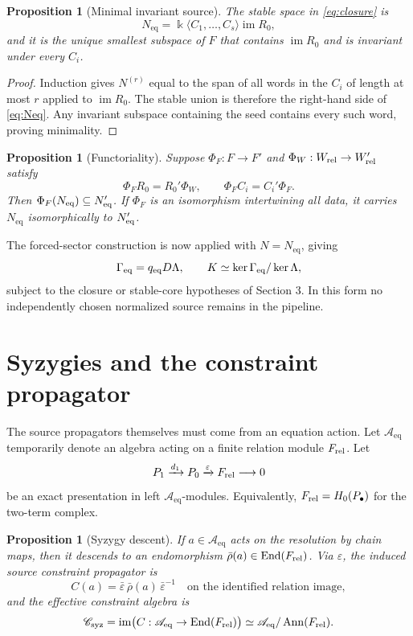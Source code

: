 \documentclass[11pt]{article}
\newtheorem{proposition}[theorem]{Proposition}
\theoremstyle{definition}
\newcommand{\kk}{\Bbbk}
\newcommand{\im}{\operatorname{im}}
\newcommand{\End}{\operatorname{End}}
\newcommand{\Aeq}{\mathscr A_{\mathrm{eq}}}
\newcommand{\Neq}{N_{\mathrm{eq}}}
\newcommand{\Geq}{\Gamma_{\mathrm{eq}}}
\newcommand{\Csyz}{\mathscr C_{\mathrm{syz}}}
\begin{document}
\begin{proposition}[Minimal invariant source]
The stable space in \eqref{eq:closure} is
\begin{equation}
\Neq=\kk\langle C_1,\ldots,C_s\rangle\im R_0,
\label{eq:Neq}
\end{equation}
and it is the unique smallest subspace of \(F\) that contains \(\im R_0\) and is invariant under
every \(C_i\).
\end{proposition}

\begin{proof}
Induction gives \(N^{(r)}\) equal to the span of all words in the \(C_i\) of length at most
\(r\) applied to \(\im R_0\). The stable union is therefore the right-hand side of
\eqref{eq:Neq}. Any invariant subspace containing the seed contains every such word, proving
minimality.
\end{proof}

\begin{proposition}[Functoriality]
Suppose \(\Phi_F:F\to F'\) and \(\Phi_W:W_{\rm rel}\to W'_{\rm rel}\) satisfy
\[
\Phi_FR_0=R_0'\Phi_W,
\qquad
\Phi_FC_i=C_i'\Phi_F.
\]
Then \(\Phi_F(\Neq)\subseteq N_{\rm eq}'\). If \(\Phi_F\) is an isomorphism intertwining all
data, it carries \(\Neq\) isomorphically to \(N_{\rm eq}'\).
\end{proposition}

The forced-sector construction is now applied with \(N=\Neq\), giving
\[
\Geq=q_{\rm eq}D\Lambda,
\qquad
K\simeq\ker\Geq/\ker\Lambda,
\]
subject to the closure or stable-core hypotheses of Section 3. In this form no independently
chosen normalized source remains in the pipeline.

\section{Syzygies and the constraint propagator}

The source propagators themselves must come from an equation action. Let \(\Aeq\) temporarily denote
an algebra acting on a finite relation module \(F_{\rm rel}\). Let
\[
P_1\xrightarrow{d_1}P_0\xrightarrow{\varepsilon}F_{\rm rel}\longrightarrow 0
\]
be an exact presentation in left \(\Aeq\)-modules. Equivalently,
\(F_{\rm rel}=H_0(P_\bullet)\) for the two-term complex.

\begin{proposition}[Syzygy descent]
If \(a\in\Aeq\) acts on the resolution by chain maps, then it descends to an endomorphism
\(\bar\rho(a)\in\End(F_{\rm rel})\). Via \(\varepsilon\), the induced source constraint
propagator is
\begin{equation}
C(a)=\bar\varepsilon\,\bar\rho(a)\,\bar\varepsilon^{-1}
\quad\text{on the identified relation image},
\label{eq:Csyzygy}
\end{equation}
and the effective constraint algebra is
\begin{equation}
\Csyz=\im\bigl(C:\Aeq\to\End(F_{\rm rel})\bigr)
\simeq\Aeq/\operatorname{Ann}(F_{\rm rel}).
\label{eq:Csyz}
\end{equation}
\end{proposition}
\end{document}
